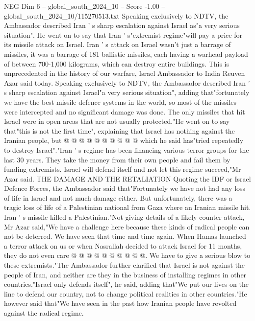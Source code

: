 \begin{textsample}{NEG Dim 6 – global\_south\_2024\_10 – Score -1.00 – global\_south\_2024\_10/115270513.txt}  \label{ex:f6_neg_034}
Speaking exclusively to NDTV, the Ambassador described Iran ' s sharp escalation against Israel as"a very serious situation".
He went on to say that Iran ' s"extremist regime"will pay a price for its missile attack on Israel.
Iran ' s attack on Israel wasn't just a barrage of missiles, it was a barrage of 181 ballistic missiles, each having a warhead payload of between 700-1,000 kilograms, which can destroy entire buildings.
This is unprecedented in the history of our warfare, Israel Ambassador to India Reuven Azar said today.
Speaking exclusively to NDTV, the Ambassador described Iran ' s sharp escalation against Israel"a very serious situation", adding that"fortunately we have the best missile defence systems in the world, so most of the missiles were intercepted and no significant damage was done.
The only missiles that hit Israel were in open areas that are not usually protected."He went on to say that"this is not the first time", explaining that Israel has nothing against the Iranian people, but @ @ @ @ @ @ @ @ @ @ which he said has"tried repeatedly to destroy Israel"."Iran ' s regime has been financing various terror groups for the last 30 years.
They take the money from their own people and fail them by funding extremists.
Israel will defend itself and not let this regime succeed,"Mr Azar said.
THE DAMAGE AND THE RETALIATION Quoting the IDF or Israel Defence Forces, the Ambassador said that"Fortunately we have not had any loss of life in Israel and not much damage either.
But unfortunately, there was a tragic loss of life of a Palestinian national from Gaza where an Iranian missile hit.
Iran ' s missile killed a Palestinian."Not giving details of a likely counter-attack, Mr Azar said,"We have a challenge here because these kinds of radical people can not be deterred.
We have seen that time and time again.
When Hamas launched a terror attack on us or when Nasrallah decided to attack Israel for 11 months, they do not even care @ @ @ @ @ @ @ @ @ @.
We have to give a serious blow to these extremists."The Ambassador further clarified that Israel is not against the people of Iran, and neither are they in the business of installing regimes in other countries."Israel only defends itself", he said, adding that"We put our lives on the line to defend our country, not to change political realities in other countries."He however said that"We have seen in the past how Iranian people have revolted against the radical regime.

\end{textsample}
